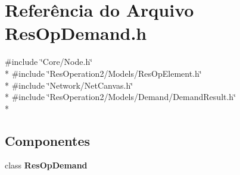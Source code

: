 \section{Referência do Arquivo Res\+Op\+Demand.\+h}
\label{_res_op_demand_8h}
{\ttfamily \#include \char`\"{}Core/\+Node.\+h\char`\"{}}\\*
{\ttfamily \#include \char`\"{}Res\+Operation2/\+Models/\+Res\+Op\+Element.\+h\char`\"{}}\\*
{\ttfamily \#include \char`\"{}Network/\+Net\+Canvas.\+h\char`\"{}}\\*
{\ttfamily \#include \char`\"{}Res\+Operation2/\+Models/\+Demand/\+Demand\+Result.\+h\char`\"{}}\\*
\subsection*{Componentes}
\begin{DoxyCompactItemize}
\item 
class {\bf Res\+Op\+Demand}
\end{DoxyCompactItemize}
